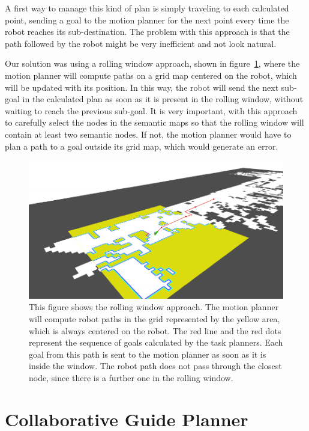 A first way to manage this kind of plan is simply traveling to each calculated point, sending a goal to the motion planner for the next point every time the robot reaches its sub-destination. The problem with this approach is that the path followed by the robot might be very inefficient and not look natural.

Our solution was using a rolling window approach, shown in figure~\ref{fig:case_study-spencer-rolling_window}, where the motion planner will compute paths on a grid map centered on the robot, which will be updated with its position. In this way, the robot will send the next sub-goal in the calculated plan as soon as it is present in the rolling window, without waiting to reach the previous sub-goal. It is very important, with this approach to carefully select the nodes in the semantic maps so that the rolling window will contain at least two semantic nodes. If not, the motion planner would have to plan a path to a goal outside its grid map, which would generate an error.


\begin{figure}[ht!]
	\centering
	\includegraphics[]{img/case_study/spencer/rolling_window.pdf}
	\caption[Rolling window]{This figure shows the rolling window approach. The motion planner will compute robot paths in the grid represented by the yellow area, which is always centered on the robot. The red line and the red dots represent the sequence of goals calculated by the task planners. Each goal from this path is sent to the motion planner as soon as it is inside the window. The robot path does not pass through the closest node, since there is a further one in the rolling window.}
	\label{fig:case_study-spencer-rolling_window}
\end{figure}

\section{Collaborative Guide Planner }
\label{sec:spencer-collaborative_guide_planner}

